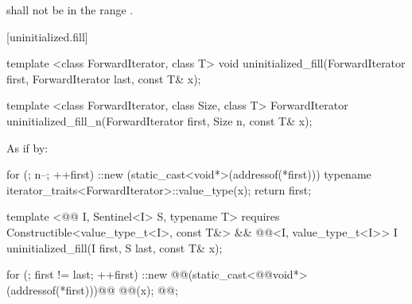 \pnum
\requires {} shall not be in the range .

[uninitialized.fill]{}
{\color{remclr}
\begin{codeblock}
template <class ForwardIterator, class T>
  void uninitialized_fill(ForwardIterator first, ForwardIterator last,
                          const T& x);
\end{codeblock}

\begin{codeblock}
template <class ForwardIterator, class Size, class T>
  ForwardIterator uninitialized_fill_n(ForwardIterator first, Size n, const T& x);
\end{codeblock}

\setcounter{Paras}{1}
\pnum
\effects As if by:
\begin{codeblock}
        for (; n--; ++first)
          ::new (static_cast<void*>(addressof(*first)))
            typename iterator_traits<ForwardIterator>::value_type(x);
        return first;
\end{codeblock}
} %

{\color{addclr}
\begin{codeblock}
template <@@ I, Sentinel<I> S, typename T>
requires
  Constructible<value_type_t<I>, const T&> &&
  @@<I, value_type_t<I>> I uninitialized_fill(I first, S last, const T& x);
\end{codeblock}
} %

\setcounter{Paras}{0}
\pnum
\effects {}
\begin{codeblock}
    for (; first != last; ++first)
      ::new @@(static_cast<@@void*>(addressof(*first)))@\added{)}@
        @@(x);
    @@;
\end{codeblock}

